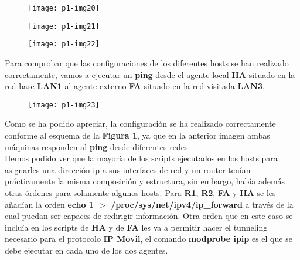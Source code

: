 \documentclass[10pt]{article}
\begin{document}
\begin{figure}[H]
	\begin{center}
 		\texttt{[image: p1-img20]}
	\end{center} 
\end{figure}

\begin{figure}[H]
	\begin{center}
 		\texttt{[image: p1-img21]}
	\end{center} 
\end{figure}

\begin{figure}[H]
	\begin{center}
 		\texttt{[image: p1-img22]}
	\end{center} 
\end{figure}

Para comprobar que las configuraciones de los diferentes hosts se han realizado correctamente, vamos a ejecutar un \textbf{ping} desde el agente local \textbf{HA} situado en la red base \textbf{LAN1} al agente externo \textbf{FA} situado en la red visitada \textbf{LAN3}. \\

\begin{figure}[H]
	\begin{center}
 		\texttt{[image: p1-img23]}
	\end{center} 
\end{figure}

Como se ha podido apreciar, la configuración se ha realizado correctamente conforme al esquema de la \textbf{Figura 1}, ya que en la anterior imagen ambas máquinas responden al \textbf{ping} desde diferentes redes.\\

Hemos podido ver que la mayoría de los scripts ejecutados en los hosts para asignarles una dirección ip a sus interfaces de red y un router tenían prácticamente la misma composición y estructura, sin embargo, había además otras órdenes para solamente algunos hosts. Para \textbf{R1}, \textbf{R2}, \textbf{FA} y \textbf{HA} se les añadían la orden \textbf{echo 1 $>$  /proc/sys/net/ipv4/ip\_forward} a través de la cual puedan ser capaces de redirigir información. Otra orden que en este caso se incluía en los scripts de \textbf{HA} y de \textbf{FA} les va a permitir hacer el tunneling necesario para el protocolo \textbf{IP Movil}, el comando \textbf{modprobe ipip} es el que se debe ejecutar en cada uno de los dos agentes. \\
\end{document}

